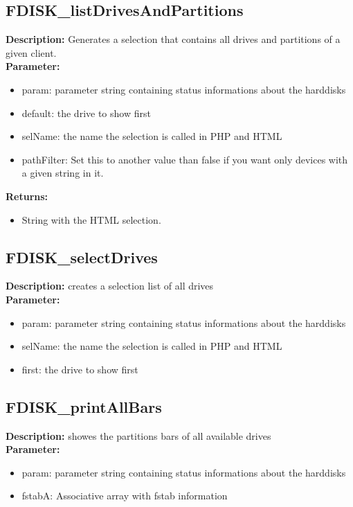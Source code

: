 \subsection{FDISK\_listDrivesAndPartitions}
\textbf{Description:} Generates a selection that contains all drives and partitions of a given client.\\
\textbf{Parameter:}
\begin{itemize}
\item param: parameter string containing status informations about the harddisks
\item default: the drive to show first
\item selName: the name the selection is called in PHP and HTML
\item pathFilter: Set this to another value than false if you want only devices with a given string in it.
\end{itemize}
\textbf{Returns:}
\begin{itemize}
\item String with the HTML selection.
\end{itemize}

\subsection{FDISK\_selectDrives}
\textbf{Description:} creates a selection list of all drives\\
\textbf{Parameter:}
\begin{itemize}
\item param: parameter string containing status informations about the harddisks
\item selName: the name the selection is called in PHP and HTML
\item first: the drive to show first
\end{itemize}

\subsection{FDISK\_printAllBars}
\textbf{Description:} showes the partitions bars of all available drives\\
\textbf{Parameter:}
\begin{itemize}
\item param: parameter string containing status informations about the harddisks
\item fstabA: Associative array with fstab information
\end{itemize}

